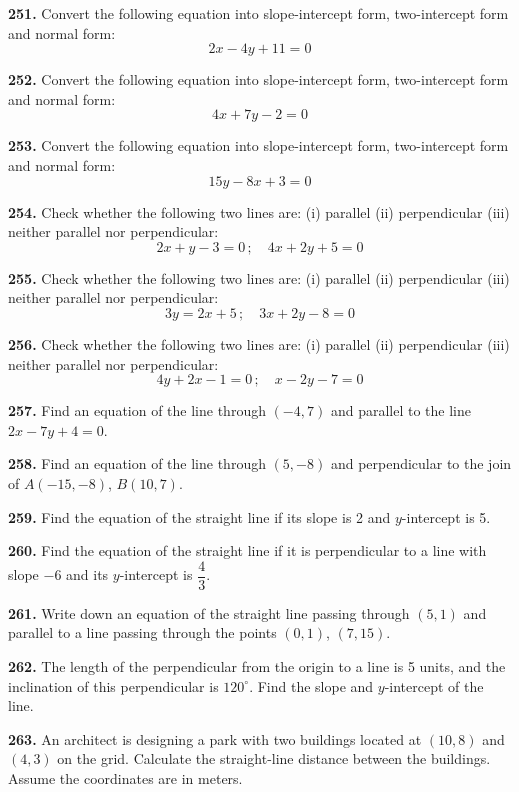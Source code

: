 \documentclass[11pt]{article}
\begin{document}
\bigskip
\noindent\textbf{251.} Convert the following equation into slope-intercept form, two-intercept form and normal form:
\[
2x - 4y + 11 = 0
\]

\bigskip
\noindent\textbf{252.} Convert the following equation into slope-intercept form, two-intercept form and normal form:
\[
4x + 7y - 2 = 0
\]

\bigskip
\noindent\textbf{253.} Convert the following equation into slope-intercept form, two-intercept form and normal form:
\[
15y - 8x + 3 = 0
\]

\bigskip
\noindent\textbf{254.} Check whether the following two lines are: (i) parallel (ii) perpendicular (iii) neither parallel nor perpendicular:
\[
2x + y - 3 = 0 \, ; \quad 4x + 2y + 5 = 0
\]

\bigskip
\noindent\textbf{255.} Check whether the following two lines are: (i) parallel (ii) perpendicular (iii) neither parallel nor perpendicular:
\[
3y = 2x + 5 \, ; \quad 3x + 2y - 8 = 0
\]

\bigskip
\noindent\textbf{256.} Check whether the following two lines are: (i) parallel (ii) perpendicular (iii) neither parallel nor perpendicular:
\[
4y + 2x - 1 = 0 \, ; \quad x - 2y - 7 = 0
\]

\bigskip
\noindent\textbf{257.} Find an equation of the line through $(-4,7)$ and parallel to the line $2x - 7y + 4 = 0$.

\bigskip
\noindent\textbf{258.} Find an equation of the line through $(5,-8)$ and perpendicular to the join of $A(-15,-8)$, $B(10,7)$.

\bigskip
\noindent\textbf{259.} Find the equation of the straight line if its slope is 2 and $y$-intercept is 5.

\bigskip
\noindent\textbf{260.} Find the equation of the straight line if it is perpendicular to a line with slope $-6$ and its $y$-intercept is $\dfrac{4}{3}$.

\bigskip
\noindent\textbf{261.} Write down an equation of the straight line passing through $(5,1)$ and parallel to a line passing through the points $(0,1)$, $(7,15)$.

\bigskip
\noindent\textbf{262.} The length of the perpendicular from the origin to a line is 5 units, and the inclination of this perpendicular is $120^{\circ}$. Find the slope and $y$-intercept of the line.

\bigskip
\noindent\textbf{263.} An architect is designing a park with two buildings located at $(10,8)$ and $(4,3)$ on the grid. Calculate the straight-line distance between the buildings. Assume the coordinates are in meters.
\end{document}
